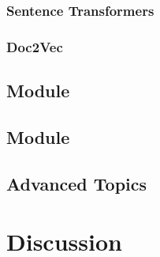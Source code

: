 \documentclass[article]{jss}
\begin{document}
\subsubsection{Sentence Transformers}\label{subsubsec:using-embed-st}

\subsubsection{Doc2Vec}\label{subsubsec:using-embed-doc2vec}

\subsection[cluster Module]{ Module}\label{subsec:using-cluster}

\subsection[explain Module]{ Module}\label{subsec:using-explain}

\subsection[Advanced Topics]{Advanced Topics}\label{subsec:using-advanced}

\section[Discussion]{Discussion} \label{sec:discussion}


\end{document}
